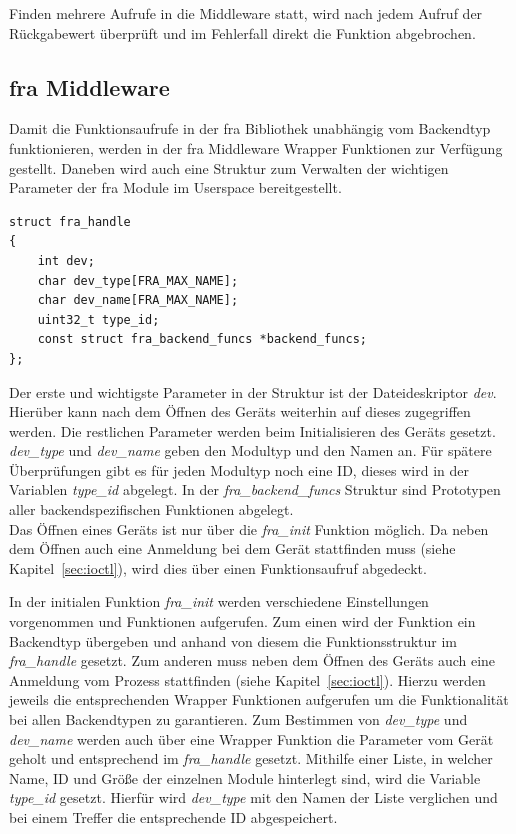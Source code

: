 Finden mehrere Aufrufe in die Middleware statt, wird nach jedem Aufruf der Rückgabewert überprüft und im Fehlerfall direkt die Funktion abgebrochen.


\subsection{\ac{fra} Middleware}
Damit die Funktionsaufrufe in der \ac{fra} Bibliothek unabhängig vom Backendtyp funktionieren, werden in der \ac{fra} Middleware Wrapper Funktionen zur Verfügung gestellt. Daneben wird auch eine Struktur zum Verwalten der wichtigen Parameter der \ac{fra} Module im Userspace bereitgestellt.


\begin{lstfloat}
\begin{lstlisting}
struct fra_handle
{
	int dev;
	char dev_type[FRA_MAX_NAME];
	char dev_name[FRA_MAX_NAME];
	uint32_t type_id;
	const struct fra_backend_funcs *backend_funcs;
};
\end{lstlisting}
\end{lstfloat}
Der erste und wichtigste Parameter in der Struktur ist der Dateideskriptor \textit{dev}. Hierüber kann nach dem Öffnen des Geräts weiterhin auf dieses zugegriffen werden. Die restlichen Parameter werden beim Initialisieren des Geräts gesetzt. \textit{dev\_type} und \textit{dev\_name} geben den Modultyp und den Namen an. 
Für spätere Überprüfungen gibt es für jeden Modultyp noch eine ID, dieses wird in der Variablen \textit{type\_id} abgelegt. In der \textit{fra\_backend\_funcs} Struktur sind Prototypen aller backendspezifischen Funktionen abgelegt.\\

Das Öffnen eines Geräts ist nur über die \textit{fra\_init} Funktion möglich. Da neben dem Öffnen auch eine Anmeldung bei dem Gerät stattfinden muss (siehe Kapitel~\ref{sec:ioctl}), wird dies über einen Funktionsaufruf abgedeckt. 

In der initialen Funktion \textit{fra\_init} werden verschiedene Einstellungen vorgenommen und Funktionen aufgerufen. Zum einen wird der Funktion ein Backendtyp übergeben und anhand von diesem die Funktionsstruktur im \textit{fra\_handle} gesetzt.
Zum anderen muss neben dem Öffnen des Geräts auch eine Anmeldung vom Prozess stattfinden (siehe Kapitel~\ref{sec:ioctl}). Hierzu werden jeweils die entsprechenden Wrapper Funktionen aufgerufen um die Funktionalität bei allen Backendtypen zu garantieren. Zum Bestimmen von \textit{dev\_type} und \textit{dev\_name} werden auch über eine Wrapper Funktion die Parameter vom Gerät geholt und entsprechend im \textit{fra\_handle} gesetzt. Mithilfe einer Liste, in welcher Name, ID und Größe der einzelnen Module hinterlegt sind, wird die Variable \textit{type\_id} gesetzt. Hierfür wird \textit{dev\_type} mit den Namen der Liste verglichen und bei einem Treffer die entsprechende ID abgespeichert.\\



